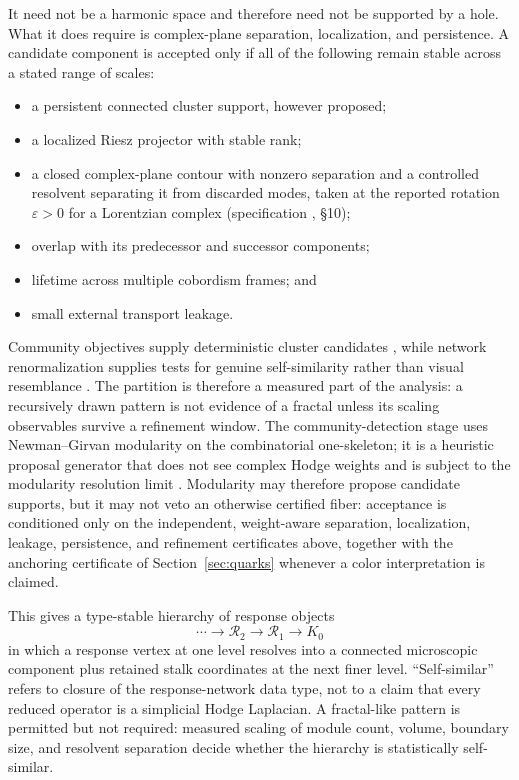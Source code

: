 \documentclass[11pt,letterpaper]{article}
\newcommand{\RN}{\mathcal{R}}
\begin{document}
It need not be a harmonic space and therefore need not be supported by a hole.
What it does require is complex-plane separation, localization, and
persistence. A
candidate component is accepted only if all of the following remain stable
across a stated range of scales:
\begin{itemize}
  \item a persistent connected cluster support, however proposed;
  \item a localized Riesz projector with stable rank;
  \item a closed complex-plane contour with nonzero separation and a controlled
    resolvent separating it from discarded modes, taken at the reported
    rotation $\varepsilon>0$ for a Lorentzian complex
    (specification \cite{whitneyspec}, \S10);
  \item overlap with its predecessor and successor components;
  \item lifetime across multiple cobordism frames; and
  \item small external transport leakage.
\end{itemize}

Community objectives supply deterministic cluster candidates
\cite{reichardtbornholdt2006}, while network renormalization supplies tests for
genuine self-similarity rather than visual resemblance \cite{songhavlin2005}.
The partition is therefore a measured part of the analysis: a recursively drawn
pattern is not evidence of a fractal unless its scaling observables survive a
refinement window. The community-detection stage uses Newman--Girvan
modularity on the combinatorial one-skeleton; it is a heuristic proposal
generator that does not see complex Hodge weights and is subject to
the modularity resolution limit \cite{fortunatobarthelemy2007}. Modularity may
therefore propose candidate supports, but it may not veto an otherwise
certified fiber: acceptance is conditioned only on the independent,
weight-aware separation, localization, leakage, persistence, and refinement
certificates above, together with the anchoring certificate of
Section~\ref{sec:quarks} whenever a color interpretation is claimed.

This gives a type-stable hierarchy of response objects
\begin{equation*}
  \cdots\longrightarrow\RN_{2}\longrightarrow\RN_{1}\longrightarrow K_{0}
\end{equation*}
in which a response vertex at one level resolves into a connected microscopic
component plus retained stalk coordinates at the next finer level.
``Self-similar'' refers to closure of the response-network data type, not to a
claim that every reduced operator is a simplicial Hodge Laplacian. A
fractal-like pattern is permitted but not required: measured scaling of module
count, volume, boundary size, and resolvent separation decide whether the
hierarchy is statistically self-similar.
\end{document}
